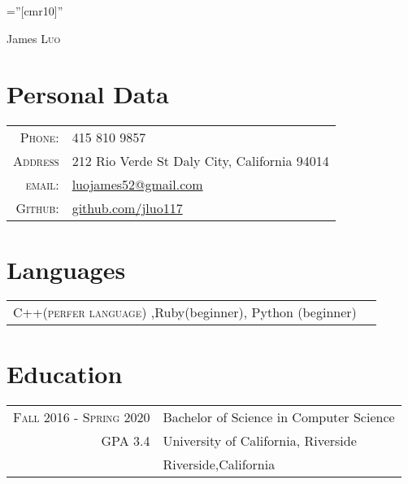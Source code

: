 \documentclass[a4paper,12pt]{article}
\begin{document}

\pagestyle{empty} %

\font\fb=''[cmr10]'' %

\par{\centering
		{\Huge James \textsc{Luo}
	}\bigskip\par}

\section{Personal Data}

\begin{tabular}{rl}
        \textsc{Phone:}     & 415 810 9857\\
        \textsc{Address} & 212 Rio Verde St Daly City, California 94014\\
    \textsc{email:}     & \href{mailto:luojames52@gmail.com}{luojames52@gmail.com}\\
    \textsc{Github:} &
    \href{https://github.com/jluo117}{github.com/jluo117}
\end{tabular}

\section{Languages}
\begin{tabular}{rl}

\textsc{C++(perfer language)} ,{Ruby(beginner)}, {Python (beginner)} \\
\end{tabular}

\section{Education}
\begin{tabular}{rl}
\textsc{Fall 2016 - Spring 2020} & Bachelor of Science in Computer Science\\
\textsc{GPA 3.4}
& University of California, Riverside \\
& Riverside,California\\
\end{tabular}
\end{document}
